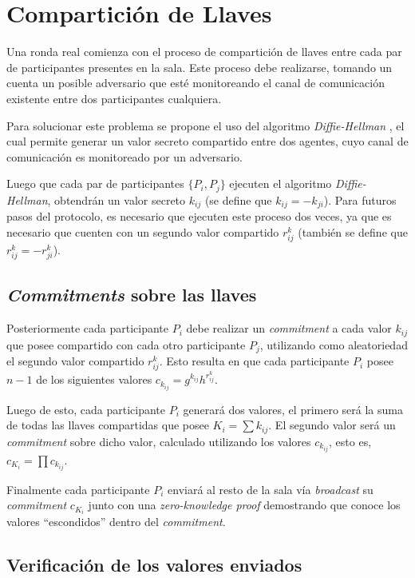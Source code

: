 \section{Compartición de Llaves}

Una ronda real comienza con el proceso de compartición de llaves entre cada 
par de participantes presentes en la sala. Este proceso debe realizarse, 
tomando un cuenta un posible adversario que esté monitoreando el canal de 
comunicación existente entre dos participantes cualquiera.

Para solucionar este problema se propone el uso del algoritmo 
\emph{Diffie-Hellman} \cite{diffie1976new}, el cual permite generar un valor 
secreto compartido entre dos agentes, cuyo canal de comunicación es 
monitoreado por un adversario.

Luego que cada par de participantes $\{P_i, P_j\}$ ejecuten el algoritmo 
\emph{Diffie-Hellman}, obtendrán un valor secreto $k_{ij}$ (se define que $k_{ij} = -k_{ji}$). 
Para futuros pasos 
del protocolo, es necesario que ejecuten este proceso dos veces, ya que es 
necesario que cuenten con un segundo valor compartido $r^k_{ij}$ (también se define 
que $r^k_{ij} = -r^k_{ji}$).

\subsection{\emph{Commitments} sobre las llaves}

Posteriormente cada participante $P_i$ debe realizar un \emph{commitment} a 
cada valor $k_{ij}$ que posee compartido con cada otro participante $P_j$, 
utilizando como aleatoriedad el segundo valor compartido $r^k_{ij}$. Esto 
resulta en que cada participante $P_i$ posee $n - 1$ de los siguientes valores 
$c_{k_{ij}} = g^{k_{ij}} h^{r^k_{ij}}$.

Luego de esto, cada participante $P_i$ generará dos valores, el primero será 
la suma de todas las llaves compartidas que posee $K_i = \sum k_{ij}$. El 
segundo valor será un \emph{commitment} sobre dicho valor, calculado utilizando 
los valores $c_{k_{ij}}$, esto es, 
$c_{K_i} = \prod c_{k_{ij}}$.

Finalmente cada participante $P_i$ enviará al resto de la sala vía 
\emph{broadcast} su \emph{commitment} $c_{K_i}$ junto con una 
\emph{zero-knowledge proof} demostrando que conoce los valores ``escondidos'' 
dentro del \emph{commitment}.

\subsection{Verificación de los valores enviados}

